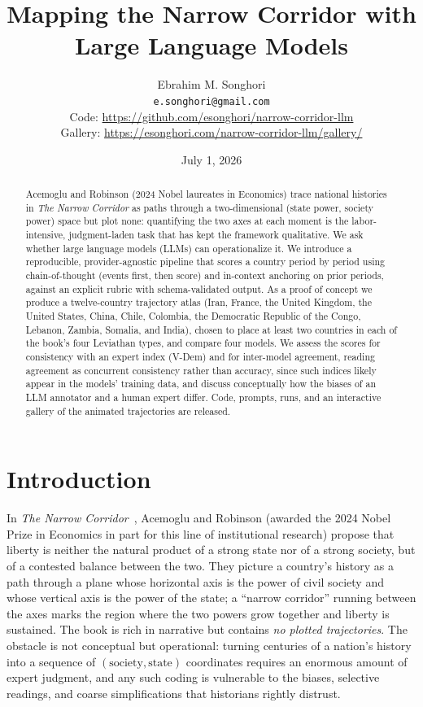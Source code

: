 \documentclass[twocolumn,10pt]{article}
\title{\bf Mapping the Narrow Corridor with Large Language Models}
\author{Ebrahim M. Songhori \\ \texttt{e.songhori@gmail.com} \\[3pt]
  {\small Code: \url{https://github.com/esonghori/narrow-corridor-llm}} \\
  {\small Gallery: \url{https://esonghori.com/narrow-corridor-llm/gallery/}}}
\date{July 1, 2026}
\begin{document}
\maketitle

\begin{abstract}
Acemoglu and Robinson (2024 Nobel laureates in Economics) trace national
histories in \emph{The Narrow Corridor} as paths through a two-dimensional
(state power, society power) space but plot none: quantifying the two axes at
each moment is the labor-intensive,
judgment-laden task that has kept the framework qualitative. We ask whether large
language models (LLMs) can operationalize it. We introduce a reproducible,
provider-agnostic pipeline that scores a country period by period using
chain-of-thought (events first, then score) and in-context anchoring on prior
periods, against an explicit rubric with schema-validated output. As a proof of
concept we produce a twelve-country trajectory atlas (Iran, France, the United
Kingdom, the United States, China, Chile, Colombia, the Democratic Republic
of the Congo, Lebanon, Zambia, Somalia, and India), chosen to place at least two
countries in each of the book's four
Leviathan types, and compare four models. We assess the
scores for consistency with an expert index (V-Dem) and for inter-model
agreement, reading agreement as concurrent consistency rather than accuracy,
since such indices likely appear in the models' training data, and discuss
conceptually how the biases of an LLM annotator and a human expert differ. Code,
prompts, runs, and an interactive gallery of the animated trajectories are
released.
\end{abstract}

\section{Introduction}
\label{sec:intro}

In \emph{The Narrow Corridor}~\citep{acemoglu2019narrow}, Acemoglu and Robinson
(awarded the 2024 Nobel Prize in Economics in part for this line of institutional
research) propose that liberty is neither the natural product of a strong state nor of a
strong society, but of a contested balance between the two. They picture a
country's history as a path through a plane whose horizontal axis is the power
of civil society and whose vertical axis is the power of the state; a ``narrow
corridor'' running between the axes marks the region where the two powers grow
together and liberty is sustained. The book is rich in narrative but contains
\emph{no plotted trajectories}. The obstacle is not conceptual but
operational: turning centuries of a nation's history into a sequence of
$(\text{society}, \text{state})$ coordinates requires an enormous amount of
expert judgment, and any such coding is vulnerable to the biases, selective
readings, and coarse simplifications that historians rightly distrust.
\end{document}

